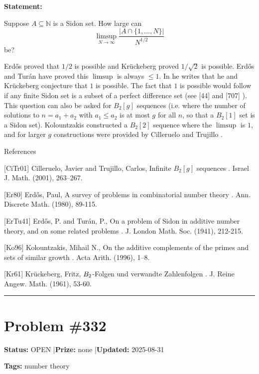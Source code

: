 \documentclass{article}
\begin{document}
\noindent\textbf{Statement:}

Suppose $A\subseteq \mathbb{N}$ is a Sidon set. How large can\[\limsup_{N\to \infty}\frac{\lvert A\cap \{1,\ldots,N\}\rvert}{N^{1/2}}\]be?




Erd\H{o}s proved that $1/2$ is possible and Kr\"{u}ckeberg \cite{Kr61} proved $1/\sqrt{2}$ is possible. Erd\H{o}s and Tur\'{a}n \cite{ErTu41} have proved this $\limsup$ is always $\leq 1$. In \cite{Er80} he writes that he and Kr\"{u}ckeberg conjecture that $1$ is possible. The fact that $1$ is possible would follow if any finite Sidon set is a subset of a perfect difference set (see [44] and [707] ). This question can also be asked for $B_2[g]$ sequences (i.e. where the number of solutions to $n=a_1+a_2$ with $a_1\leq a_2$ is at most $g$ for all $n$, so that a $B_2[1]$ set is a Sidon set). Kolountzakis \cite{Ko96} constructed a $B_2[2]$ sequence where the $\limsup$ is $1$, and for larger $g$ constructions were provided by Cilleruelo and Trujillo \cite{CiTr01}.




References

[CiTr01] Cilleruelo, Javier and Trujillo, Carlos, Infinite {$B_2[g]$} sequences . Israel J. Math. (2001), 263--267.

[Er80] Erd\H{o}s, Paul, A survey of problems in combinatorial number theory . Ann. Discrete Math. (1980), 89-115.

[ErTu41] Erd\H{o}s, P. and Tur\'{a}n, P., On a problem of Sidon in additive number theory, and on some related problems . J. London Math. Soc. (1941), 212-215.

[Ko96] Kolountzakis, Mihail N., On the additive complements of the primes and sets of similar growth . Acta Arith. (1996), 1--8.

[Kr61] Kr\"{u}ckeberg, Fritz, $B\sb{2}$-Folgen und verwandte Zahlenfolgen . J. Reine Angew. Math. (1961), 53-60.

\noindent\rule{\linewidth}{0.4pt}


\section{Problem \#332}
\label{prob:332}

\noindent\textbf{Status:} OPEN \quad|\quad \textbf{Prize:} none \quad|\quad \textbf{Updated:} 2025-08-31

\noindent\textbf{Tags:} number theory
\end{document}
